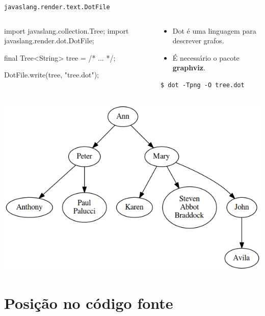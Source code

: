 \begin{frame}{\texttt{javaslang.render.text.DotFile}}
  \small
  \begin{columns}[t]
    \begin{column}{.5\textwidth}
\begin{pygmented}[]
import javaslang.collection.Tree;
import javaslang.render.dot.DotFile;

final Tree<String> tree = /* ... */;

DotFile.write(tree, "tree.dot");
\end{pygmented}
    \end{column}
    \begin{column}{.5\textwidth}
      \begin{itemize}
        \item Dot é uma linguagem para descrever grafos.
        \item É necessário o pacote \textbf{graphviz}.
      \end{itemize}
\begin{Verbatim}[frame=single]
$ dot -Tpng -O tree.dot
\end{Verbatim}
    \end{column}
  \end{columns}
  \begin{center}
    \includegraphics[scale=.35]{images/tree.png}
  \end{center}
\end{frame}

\section{Posição no código fonte}

